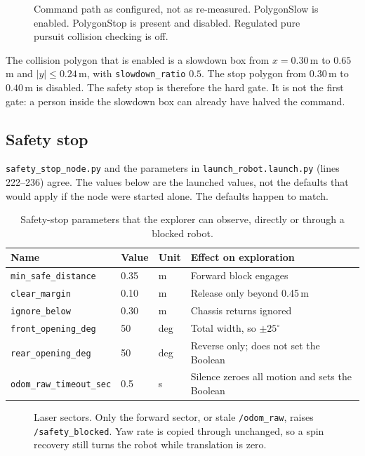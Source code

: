 \documentclass[11pt]{article}
\begin{document}
\begin{figure}[ht]
\centering
\FigCommandChain
\caption{Command path as configured, not as re-measured. PolygonSlow is enabled. PolygonStop is present and disabled. Regulated pure pursuit collision checking is off.}
\label{fig:chain}
\end{figure}

The collision polygon that is enabled is a slowdown box from $x=0.30$\,m to $0.65$\,m and $|y|\le 0.24$\,m, with \texttt{slowdown\_ratio} $0.5$. The stop polygon from $0.30$\,m to $0.40$\,m is disabled. The safety stop is therefore the hard gate. It is not the first gate: a person inside the slowdown box can already have halved the command.

\subsection{Safety stop}
\label{sec:safety}
\texttt{safety\_stop\_node.py} and the parameters in \texttt{launch\_robot.launch.py} (lines 222--236) agree. The values below are the launched values, not the defaults that would apply if the node were started alone. The defaults happen to match.

\begin{table}[ht]
\centering
\caption{Safety-stop parameters that the explorer can observe, directly or through a blocked robot.}
\label{tab:safety}
\small
\begin{tabular}{@{}llll@{}}
\toprule
Name & Value & Unit & Effect on exploration \\
\midrule
\texttt{min\_safe\_distance} & 0.35 & m & Forward block engages \\
\texttt{clear\_margin} & 0.10 & m & Release only beyond 0.45\,m \\
\texttt{ignore\_below} & 0.30 & m & Chassis returns ignored \\
\texttt{front\_opening\_deg} & 50 & deg & Total width, so $\pm 25^\circ$ \\
\texttt{rear\_opening\_deg} & 50 & deg & Reverse only; does not set the Boolean \\
\texttt{odom\_raw\_timeout\_sec} & 0.5 & s & Silence zeroes all motion and sets the Boolean \\
\bottomrule
\end{tabular}
\end{table}

\begin{figure}[ht]
\centering
\FigSafetyCone
\caption{Laser sectors. Only the forward sector, or stale \texttt{/odom\_raw}, raises \texttt{/safety\_blocked}. Yaw rate is copied through unchanged, so a spin recovery still turns the robot while translation is zero.}
\label{fig:cone}
\end{figure}
\end{document}
